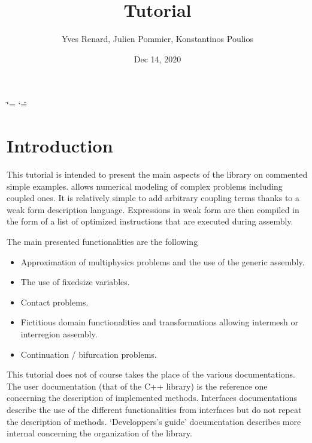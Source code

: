 \documentclass[a4paper,11pt,english]{sphinxmanual}
\title{Tutorial}
\date{Dec 14, 2020}
\author{Yves Renard, Julien Pommier, Konstantinos Poulios}
\begin{document}
\ifdefined\shorthandoff
  \ifnum\catcode`\=\string=\active\shorthandoff{=}\fi
  \ifnum\catcode`\"=\active{}\fi
\fi

\pagestyle{empty}
\sphinxmaketitle
\pagestyle{plain}
\sphinxtableofcontents
\pagestyle{normal}
\label{\detokenize{tutorial/index::doc}}



\chapter{Introduction}
\label{\detokenize{tutorial/intro:introduction}}\label{\detokenize{tutorial/intro:ud-intro-tut}}\label{\detokenize{tutorial/intro::doc}}
This tutorial is intended to present the main aspects of the  library  on commented simple examples.  allows numerical modeling of complex problems including coupled ones. It is relatively simple to add arbitrary coupling terms thanks to a weak form description language. Expressions in weak form are then compiled in the form of a list of optimized instructions that are executed during assembly.

The main presented functionalities are the following
\begin{itemize}
\item {} 
Approximation of multiphysics problems and the use of the generic assembly.

\item {} 
The use of fixed\sphinxhyphen{}size variables.

\item {} 
Contact problems.

\item {} 
Fictitious domain functionalities and transformations allowing inter\sphinxhyphen{}mesh or inter\sphinxhyphen{}region assembly.

\item {} 
Continuation / bifurcation problems.

\end{itemize}

This tutorial does not of course takes the place of the various documentations. The user documentation (that of the C++ library) is the reference one concerning the description of implemented methods. Interfaces documentations describe the use of the different functionalities from interfaces but do not repeat the description of methods. ‘Developpers’s guide’ documentation describes more internal concerning the organization of the library.
\end{document}
